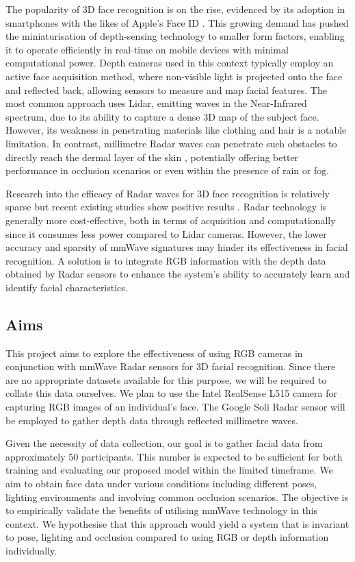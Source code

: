 \documentclass{interim}
\begin{document}
The popularity of 3D face recognition is on the rise, evidenced by its adoption in smartphones with the likes of Apple's Face ID \cite{apple-faceid}. This growing demand has pushed the miniaturisation of depth-sensing technology to smaller form factors, enabling it to operate efficiently in real-time on mobile devices with minimal computational power. Depth cameras used in this context typically employ an active face acquisition method, where non-visible light is projected onto the face and reflected back, allowing sensors to measure and map facial features. The most common approach uses Lidar, emitting waves in the Near-Infrared spectrum, due to its ability to capture a dense 3D map of the subject face. However, its weakness in penetrating materials like clothing and hair is a notable limitation. In contrast, millimetre Radar waves can penetrate such obstacles to directly reach the dermal layer of the skin \cite{vizard2006advances}, potentially offering better performance in occlusion scenarios or even within the presence of rain or fog.

Research into the efficacy of Radar waves for 3D face recognition is relatively sparse but recent existing studies show positive results \cite{hof2020face, lim2020dnn,kim2020face, pho2021radar,challa2021face}. Radar technology is generally more cost-effective, both in terms of acquisition and computationally since it consumes less power compared to Lidar cameras. However, the lower accuracy and sparsity of mmWave signatures may hinder its effectiveness in facial recognition. A solution is to integrate RGB information with the depth data obtained by Radar sensors to enhance the system's ability to accurately learn and identify facial characteristics.


\subsection{Aims}
This project aims to explore the effectiveness of using RGB cameras in conjunction with mmWave Radar sensors for 3D facial recognition. Since there are no appropriate datasets available for this purpose, we will be required to collate this data ourselves. We plan to use the Intel RealSense L515 camera \cite{intel-l515} for capturing RGB images of an individual's face. The Google Soli Radar sensor \cite{lien2016soli} will be employed to gather depth data through reflected millimetre waves. 

Given the necessity of data collection, our goal is to gather facial data from approximately 50 participants. This number is expected to be sufficient for both training and evaluating our proposed model within the limited timeframe. We aim to obtain face data under various conditions including different poses, lighting environments and involving common occlusion scenarios. The objective is to empirically validate the benefits of utilising mmWave technology in this context. We hypothesise that this approach would yield a system that is invariant to pose, lighting and occlusion compared to using RGB or depth information individually.
\end{document}

